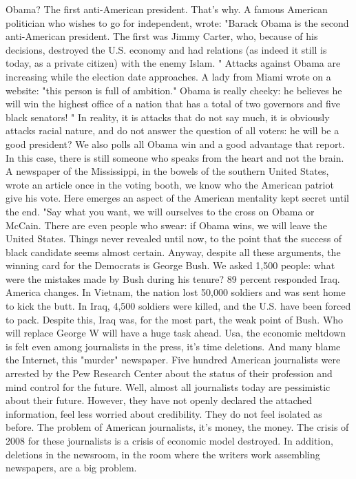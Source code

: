 Obama? The first anti-American president. That's why.
A famous American politician who wishes to go for independent, wrote: "Barack Obama is the second anti-American president.
The first was Jimmy Carter, who, because of his decisions, destroyed the U.S. economy and had relations (as indeed it still is today, as a private citizen) with the enemy Islam. "
Attacks against Obama are increasing while the election date approaches.
A lady from Miami wrote on a website: "this person is full of ambition."
Obama is really cheeky: he believes he will win the highest office of a nation that has a total of two governors and five black senators! "
In reality, it is attacks that do not say much, it is obviously attacks racial nature, and do not answer the question of all voters: he will be a good president? We also polls all Obama win and a good advantage that report.
In this case, there is still someone who speaks from the heart and not the brain.
A newspaper of the Mississippi, in the bowels of the southern United States, wrote an article once in the voting booth, we know who the American patriot give his vote.
Here emerges an aspect of the American mentality kept secret until the end.
"Say what you want, we will ourselves to the cross on Obama or McCain.
There are even people who swear: if Obama wins, we will leave the United States.
Things never revealed until now, to the point that the success of black candidate seems almost certain.
Anyway, despite all these arguments, the winning card for the Democrats is George Bush.
We asked 1,500 people: what were the mistakes made by Bush during his tenure? 89 percent responded Iraq.
America changes.
In Vietnam, the nation lost 50,000 soldiers and was sent home to kick the butt.
In Iraq, 4,500 soldiers were killed, and the U.S. have been forced to pack.
Despite this, Iraq was, for the most part, the weak point of Bush.
Who will replace George W will have a huge task ahead.
Usa, the economic meltdown is felt even among journalists in the press, it's time deletions. And many blame the Internet, this "murder" newspaper.
Five hundred American journalists were arrested by the Pew Research Center about the status of their profession and mind control for the future.
Well, almost all journalists today are pessimistic about their future.
However, they have not openly declared the attached information, feel less worried about credibility.
They do not feel isolated as before.
The problem of American journalists, it's money, the money.
The crisis of 2008 for these journalists is a crisis of economic model destroyed.
In addition, deletions in the newsroom, in the room where the writers work assembling newspapers, are a big problem.
